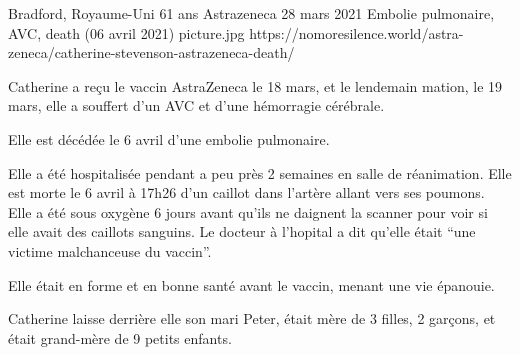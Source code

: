           {Bradford, Royaume-Uni}
          {61 ans}
          {Astrazeneca}
          {28 mars 2021}
          {Embolie pulmonaire, AVC, death (06 avril 2021)}
          {picture.jpg}
          {https://nomoresilence.world/astra-zeneca/catherine-stevenson-astrazeneca-death/}
          {

Catherine a reçu le vaccin AstraZeneca le 18 mars, et le lendemain mation, le 19
mars, elle a souffert d'un AVC et d'une hémorragie cérébrale.

Elle est décédée le 6 avril d'une embolie pulmonaire.

Elle a été hospitalisée pendant a peu près 2 semaines en salle de
réanimation. Elle est morte le 6 avril à 17h26 d'un caillot dans l'artère allant
vers ses poumons. Elle a été sous oxygène 6 jours avant qu'ils ne daignent la
scanner pour voir si elle avait des caillots sanguins. Le docteur à l'hopital a
dit qu'elle était “une victime malchanceuse du vaccin”.

Elle était en forme et en bonne santé avant le vaccin, menant une vie épanouie.

Catherine laisse derrière elle son mari Peter, était mère de 3 filles, 2
garçons, et était grand-mère de 9 petits enfants.

}
